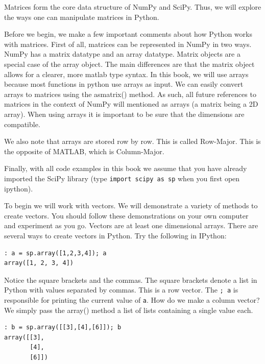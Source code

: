 

Matrices form the core data structure of NumPy and SciPy.  Thus, we will explore
the ways one can manipulate matrices in Python.

Before we begin, we make a few important comments about how Python works with matrices. First of all, matrices can be represented in NumPy in two ways.  NumPy has a matrix
datatype and an array datatype.  Matrix objects are a special case of the array
object.  The main differences are that the matrix object allows for a clearer,
more matlab type syntax.  In this book, we will use arrays because most functions in python use arrays as input. We can easily convert arrays to matrices using the asmatrix()
method.  As such, all future references to matrices in the context of NumPy will
mentioned as arrays (a matrix being a 2D array).  When using arrays it is important to be sure that the dimensions are compatible.

We also note that arrays are stored row by row. This is called Row-Major. This is the opposite of MATLAB, which is Column-Major.

Finally, with all code examples in this book we assume that you have already imported the SciPy library (type \texttt{import scipy as sp} when you first open ipython).

To begin we will work with vectors. We will demonstrate a variety of methods to
create vectors. You should follow these demonstrations on your own computer and
experiment as you go.  Vectors are at least one dimensional arrays.  There are
several ways to create vectors in Python.  Try the following in IPython:

\begin{lstlisting}
: a = sp.array([1,2,3,4]); a
array([1, 2, 3, 4])
\end{lstlisting}

Notice the square brackets and the commas.  The square brackets denote a list in
Python with values separated by commas.  This is a row vector.  The \texttt{; a}
is responsible for printing the current value of \texttt{a}.  How do we make a
column vector?  We simply pass the array() method a list of lists containing a
single value each.
\begin{lstlisting}
: b = sp.array([[3],[4],[6]]); b
array([[3],
       [4],
       [6]])
\end{lstlisting}

